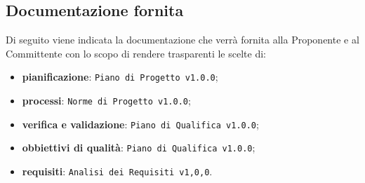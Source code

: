 \subsection{Documentazione fornita}
Di seguito viene indicata la documentazione che verrà fornita alla Proponente e al Committente con lo scopo di rendere trasparenti le scelte di:
\begin{itemize}
	\item \textbf{pianificazione}: \texttt{Piano di Progetto v1.0.0};
	\item \textbf{processi}: \texttt{Norme di Progetto v1.0.0};
	\item \textbf{verifica e validazione}: \texttt{Piano di Qualifica v1.0.0};
	\item \textbf{obbiettivi di qualità}: \texttt{Piano di Qualifica v1.0.0};
	\item \textbf{requisiti}: \texttt{Analisi dei Requisiti v1,0,0}.
\end{itemize}

